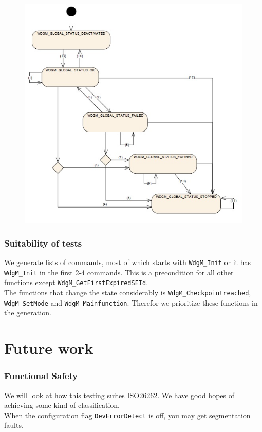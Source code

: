 \documentclass{beamer}
\begin{document}
\begin{frame}
  \begin{figure}
    \includegraphics[keepaspectratio, width=0.7\linewidth]{globalstatuses}
  \end{figure}
\end{frame}


\begin{frame}[fragile]
  \frametitle{Suitability of tests}
  We generate lists of commands, most of which starts with
  \verb!WdgM_Init! or it has \verb!WdgM_Init! in the first 2-4
  commands. This is a precondition for all other functions except
  \verb!WdgM_GetFirstExpiredSEId!.\\[0.5cm]

  The functions that change the state considerably is
  \verb!WdgM_Checkpointreached!, \verb!WdgM_SetMode! and
  \verb!WdgM_Mainfunction!.  Therefor we prioritize these functions in
  the generation.
\end{frame}

\section{Future work}

\begin{frame}[fragile]
  \frametitle{Functional Safety}
  We will look at how this testing suites ISO26262. We have good hopes of
  achieving some kind of classification.\\[0.5cm]

  When the configuration flag \verb!DevErrorDetect! is off, you may get
  segmentation faults.
\end{frame}
\end{document}
